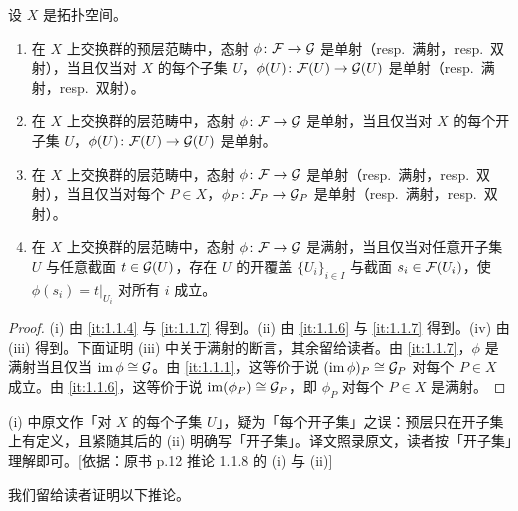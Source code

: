 \begin{corollary}\label{it:1.1.8}
设 $X$ 是拓扑空间。
\begin{enumerate}[label=(\roman*),leftmargin=2.8em]
  \item 在 $X$ 上交换群的预层范畴中，态射 $\phi\colon\mathcal{F}\to\mathcal{G}$ 是单射（resp.\ 满射，resp.\ 双射），当且仅当对 $X$ 的每个子集 $U$，$\phi(U)\colon\mathcal{F}(U)\to\mathcal{G}(U)$ 是单射（resp.\ 满射，resp.\ 双射）。
  \item 在 $X$ 上交换群的层范畴中，态射 $\phi\colon\mathcal{F}\to\mathcal{G}$ 是单射，当且仅当对 $X$ 的每个开子集 $U$，$\phi(U)\colon\mathcal{F}(U)\to\mathcal{G}(U)$ 是单射。
  \item 在 $X$ 上交换群的层范畴中，态射 $\phi\colon\mathcal{F}\to\mathcal{G}$ 是单射（resp.\ 满射，resp.\ 双射），当且仅当对每个 $P\in X$，$\phi_P\colon\mathcal{F}_P\to\mathcal{G}_P$ 是单射（resp.\ 满射，resp.\ 双射）。
  \item 在 $X$ 上交换群的层范畴中，态射 $\phi\colon\mathcal{F}\to\mathcal{G}$ 是满射，当且仅当对任意开子集 $U$ 与任意截面 $t\in\mathcal{G}(U)$，存在 $U$ 的开覆盖 $\{U_i\}_{i\in I}$ 与截面 $s_i\in\mathcal{F}(U_i)$，使 $\phi(s_i)=t|_{U_i}$ 对所有 $i$ 成立。
\end{enumerate}
\end{corollary}

\begin{proof}
(i) 由 \ref{it:1.1.4} 与 \ref{it:1.1.7} 得到。(ii) 由 \ref{it:1.1.6} 与 \ref{it:1.1.7} 得到。(iv) 由 (iii) 得到。下面证明 (iii) 中关于满射的断言，其余留给读者。由 \ref{it:1.1.7}，$\phi$ 是满射当且仅当 $\operatorname{im}\phi\cong\mathcal{G}$。由 \ref{it:1.1.1}，这等价于说 $(\operatorname{im}\phi)_P\cong\mathcal{G}_P$ 对每个 $P\in X$ 成立。由 \ref{it:1.1.6}，这等价于说 $\operatorname{im}(\phi_P)\cong\mathcal{G}_P$，即 $\phi_P$ 对每个 $P\in X$ 是满射。
\end{proof}
\begin{tnote}
(i) 中原文作「对 $X$ 的每个子集 $U$」，疑为「每个开子集」之误：预层只在开子集上有定义，且紧随其后的 (ii) 明确写「开子集」。译文照录原文，读者按「开子集」理解即可。[依据：原书 p.12 推论 1.1.8 的 (i) 与 (ii)]
\end{tnote}

我们留给读者证明以下推论。

